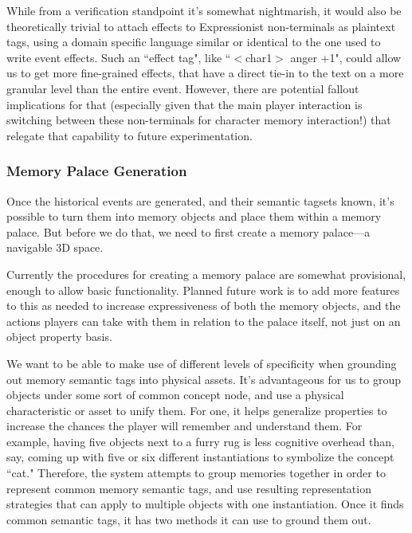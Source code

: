While from a verification standpoint it's somewhat nightmarish, it would also be theoretically trivial to attach effects to Expressionist non-terminals as plaintext tags, using a domain specific language similar or identical to the one used to write event effects. Such an ``effect tag", like ``$<$char1$>$ anger +1", could allow us to get more fine-grained effects, that have a direct tie-in to the text on a more granular level than the entire event. However, there are potential fallout implications for that (especially given that the main player interaction is switching between these non-terminals for character memory interaction!) that relegate that capability to future experimentation.

\subsubsection{Memory Palace Generation}\label{subsubsec:memory-palace-generation}

Once the historical events are generated, and their semantic tagsets known, it's possible to turn them into memory objects and place them within a memory palace. But before we do that, we need to first create a memory palace---a navigable 3D space. 

Currently the procedures for creating a memory palace are somewhat provisional, enough to allow basic functionality. Planned future work is to add more features to this as needed to increase expressiveness of both the memory objects, and the actions players can take with them in relation to the palace itself, not just on an object property basis.

We want to be able to make use of different levels of specificity when grounding out memory semantic tags into physical assets. It's advantageous for us to group objects under some sort of common concept node, and use a physical characteristic or asset to unify them. For one, it helps generalize properties to increase the chances the player will remember and understand them. For example, having five objects next to a furry rug is less cognitive overhead than, say, coming up with five or six different instantiations to symbolize the concept ``cat." Therefore, the system attempts to group memories together in order to represent common memory semantic tags, and use resulting representation strategies that can apply to multiple objects with one instantiation. Once it finds common semantic tags, it has two methods it can use to ground them out.


